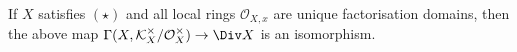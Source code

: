 If $X$ satisfies $(\star)$ and all local rings $\mathcal{O}_{X, x}$ are unique factorisation domains,
then the above map $\Gamma(X, \mathcal{K}_X^\times/\mathcal{O}_X^\times)\to \Div X$ is an
isomorphism.
